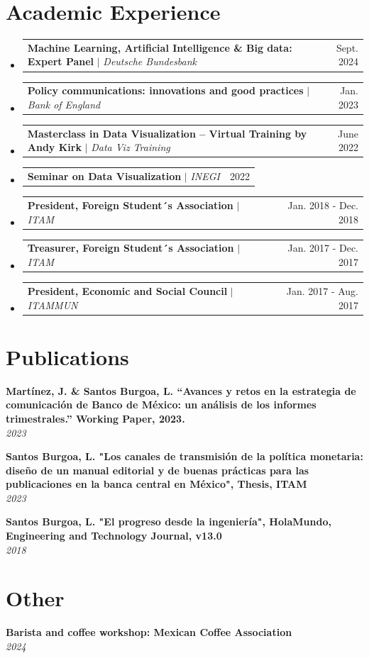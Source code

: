 \documentclass[letterpaper,11pt]{article}
\makeatletter
\newcommand{\resumeProjectHeading}[2]{
    \item
    \begin{tabular*}{0.97\textwidth}{l@{\extracolsep{\fill}}r}
      \small#1 & #2 \\
    \end{tabular*}\vspace{-7pt}
}
\newcommand{\resumeSubHeadingListStart}{\begin{itemize}[leftmargin=0.15in, label={}]}
\newcommand{\resumeSubHeadingListEnd}{\end{itemize}}
\makeatother
\begin{document}
 \section{Academic Experience}
    \resumeSubHeadingListStart
     \resumeProjectHeading
        {\textbf{Machine Learning, Artificial Intelligence \& Big data: Expert Panel} $|$ \emph{Deutsche Bundesbank}}{Sept. 2024}
    \resumeProjectHeading
        {\textbf{Policy communications: innovations and good practices} $|$ \emph{Bank of England}}{Jan. 2023}
     \resumeProjectHeading
        {\textbf{Masterclass in Data Visualization – Virtual Training by Andy Kirk} $|$ \emph{Data Viz Training}}{June 2022}
    \resumeProjectHeading
        {\textbf{Seminar on Data Visualization} $|$ \emph{INEGI}}{2022}
     \resumeProjectHeading
        {\textbf{President, Foreign Student´s Association} $|$ \emph{ITAM}}{Jan. 2018 - Dec. 2018}
    \resumeProjectHeading
        {\textbf{Treasurer, Foreign Student´s Association} $|$ \emph{ITAM}}{Jan. 2017 - Dec. 2017}
    \resumeProjectHeading
        {\textbf{President, Economic and Social Council} $|$ \emph{ITAMMUN}}{Jan. 2017 - Aug. 2017}        
   \resumeSubHeadingListEnd



\section{Publications}
  \begin{itemize}[leftmargin=0.15in, label={}]
    \small{\item{
     \textbf{Martínez, J. \& Santos Burgoa, L. “Avances y retos en la estrategia de comunicación de Banco de México: un análisis de los informes trimestrales.” Working Paper, 2023.} \\
     \textit{2023} \\
    }}

        \small{\item{
     \textbf{Santos Burgoa, L. "Los canales de transmisión de la política monetaria: diseño de un manual editorial y de buenas prácticas para las publicaciones en la banca central en México", Thesis, ITAM} \\
     \textit{2023} \\
    }}

        \small{\item{
     \textbf{Santos Burgoa, L. "El progreso desde la ingeniería", HolaMundo, Engineering and Technology Journal, v13.0} \\
     \textit{2018} \\
    }}

 \end{itemize}


\section{Other}
  \begin{itemize}[leftmargin=0.15in, label={}]
    \small{\item{
     \textbf{Barista and coffee workshop: Mexican Coffee Association} \\
     \textit{2024} \\
    }}
 \end{itemize}
\end{document}
